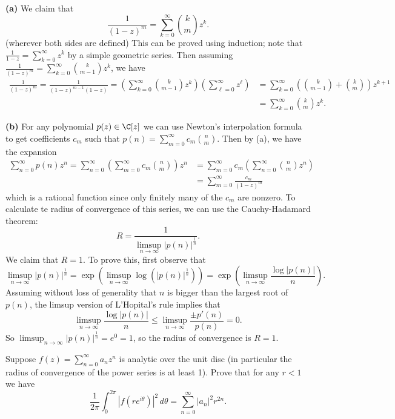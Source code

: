 \documentclass[11pt,letterpaper]{article}
\begin{document}
\begin{solution}
    \textbf{(a)} We claim that
    \[
        \frac{1}{(1-z)^m}=\sum_{k=0}^\infty\binom{k}{m}z^k.
    \]
    (wherever both sides are defined) This can be proved using induction; note that $\frac{1}{1-z}=\sum^{\infty}_{k=0}z^k$ by a simple geometric series. Then assuming $\frac{1}{(1-z)^m}=\sum^\infty_{k=0}\binom{k}{m-1}z^k$, we have
    \[
        \begin{aligned}
            \frac{1}{(1-z)^m}=\frac{1}{(1-z)^{m-1}(1-z)} =\left(\sum^\infty_{k=0}\binom{k}{m-1}z^k\right)\left(\sum^\infty_{\ell=0}z^\ell\right)&=\sum^\infty_{k=0}\left(\binom{k}{m-1}+\binom{k}{m}\right)z^{k+1}\\
            &=\sum^\infty_{k=0} \binom{k}{m}z^k.
        \end{aligned}
    \]
    
    \textbf{(b)} For any polynomial $p(z)\in \C[z]$ we can use Newton's interpolation formula to get coefficients $c_m$ such that $p(n)=\sum^\infty_{m=0}c_m\binom{n}{m}$. Then by (a), we have the expansion
    \[
        \begin{aligned}
            \sum^\infty_{n=0}p(n)z^n = \sum^\infty_{n=0}\left(\sum^\infty_{m=0}c_m\binom{n}{m}\right)z^n&=\sum^\infty_{m=0}c_m\left(\sum^\infty_{n=0}\binom{n}{m}z^n\right)\\
            &=\sum^\infty_{m=0}\frac{c_m}{(1-z)^m}
        \end{aligned}
    \]  
    which is a rational function since only finitely many of the $c_m$ are nonzero. To calculate te radius of convergence of this series, we can use the Cauchy-Hadamard theorem:
    \[
        R = \frac{1}{\limsup_{n\to \infty} |p(n)|^{\frac{1}{n}}}    
    .\] 
    We claim that $R=1$. To prove this, first observe that
    \[
        \limsup_{n\to \infty} |p(n)|^{\frac{1}{n}} = \exp\left(\limsup_{n\to \infty} \log \left(|p(n)|^{\frac{1}{n}}\right)\right) = \exp\left(\limsup_{n\to \infty}\frac{\log |p(n)|}{n}\right).
    \]  
    Assuming without loss of generality that $n$ is bigger than the largest root of $p(n)$, the limsup version of L'Hopital's rule implies that 
    \[
        \limsup_{n\to \infty} \frac{\log |p(n)|}{n} \leq \limsup_{n\to \infty} \frac{\pm p'(n)}{p(n)}=0
    .\] 
    So $\limsup_{n\to \infty} |p(n)|^{\frac{1}{n}}=e^0=1$, so the radius of convergence is $R=1$.
\end{solution}

\begin{problem}
    Suppose $f(z)=\sum^\infty_{n=0} a_n z^n$ is analytic over the unit disc (in particular the radius of convergence of the power series is at least 1). Prove that for any $r<1$ we have \[\dfrac{1}{2\pi} \displaystyle \int_0^{2\pi} |f(re^{i\theta})|^2\,d\theta=\sum^\infty_{n=0} |a_n|^2 r^{2n}.\] %
\end{problem}
\end{document}
